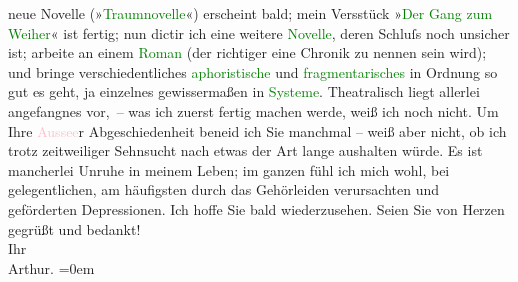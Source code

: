                     neue Novelle (»\textcolor{green}{Traumnovelle}{}\ledrightnote{\textcolor{green}{Traumnovelle}}«) erscheint bald;
                    mein Versstück »\textcolor{green}{Der Gang zum Weiher}{}\ledrightnote{\textcolor{green}{Der Gang zum Weiher. Dramatische Dichtung}}« ist
                    fertig; nun dictir ich eine weitere {\pb}\textcolor{green}{Novelle}{}, deren Schluſs noch
                    unsicher ist; arbeite an einem \textcolor{green}{Roman}{} (der richtiger eine Chronik zu nennen sein wird); und bringe
                    verschiedentliches \textcolor{green}{aphoristische}{} und \textcolor{green}{fragmentarisches}{} in Ordnung so gut es geht, ja einzelnes gewissermaßen
                    in \textcolor{green}{Systeme}{}. Theatralisch
                    liegt allerlei angefangnes vor, – was ich zuerst fertig machen werde, weiß ich
                    noch nicht.\pend
           \pstart
           Um Ihre \textcolor{pink}{Aussee}{}\ledrightnote{\textcolor{pink}{Bad Aussee}}r Abgeschiedenheit beneid ich Sie
                    manchmal – weiß aber nicht, ob ich  trotz
                    zeitweiliger Sehnsucht nach etwas der Art lange aushalten würde. Es ist
                    mancherlei Unruhe in meinem Leben; im ganzen fühl ich mich wohl, bei
                    gelegentlichen, am häufigsten durch das Gehörleiden verursachten und geförderten
                    Depressionen.\pend
           \pstart
           Ich hoffe Sie bald wiederzusehen.\pend
           \pstart
           Seien Sie von Herzen gegrüßt und bedankt!{\\[\baselineskip]}Ihr{\\[\baselineskip]}\spacefill\mbox{Arthur.}\pend
           \leftskip=0em{}\endnumbering{}  
      